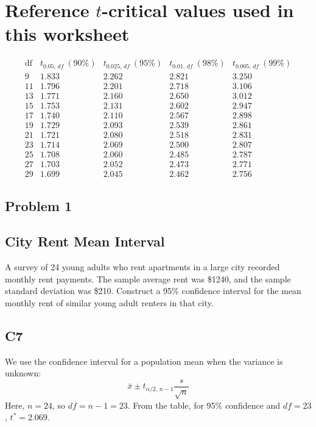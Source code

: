 


\section*{Reference $t$-critical values used in this worksheet}
\[
\begin{array}{c|cccc}
\text{df} & t_{0.05,\,df}\ (90\%) & t_{0.025,\,df}\ (95\%) & t_{0.01,\,df}\ (98\%) & t_{0.005,\,df}\ (99\%) \\
\hline
9  & 1.833 & 2.262 & 2.821 & 3.250 \\
11 & 1.796 & 2.201 & 2.718 & 3.106 \\
13 & 1.771 & 2.160 & 2.650 & 3.012 \\
15 & 1.753 & 2.131 & 2.602 & 2.947 \\
17 & 1.740 & 2.110 & 2.567 & 2.898 \\
19 & 1.729 & 2.093 & 2.539 & 2.861 \\
21 & 1.721 & 2.080 & 2.518 & 2.831 \\
23 & 1.714 & 2.069 & 2.500 & 2.807 \\
25 & 1.708 & 2.060 & 2.485 & 2.787 \\
27 & 1.703 & 2.052 & 2.473 & 2.771 \\
29 & 1.699 & 2.045 & 2.462 & 2.756
\end{array}
\]

\subsection*{Problem 1}
\subsection*{City Rent Mean Interval}
A survey of 24 young adults who rent apartments in a large city recorded monthly rent payments. The sample average rent was \$1240, and the sample standard deviation was \$210. Construct a 95\% confidence interval for the mean monthly rent of similar young adult renters in that city.

\subsection*{C7}
We use the confidence interval for a population mean when the variance is unknown:
\[
\bar{x} \pm t_{\alpha/2,\,n-1}\frac{s}{\sqrt{n}}
\]
Here, \(n=24\), so \(df=n-1=23\). From the table, for 95\% confidence and \(df=23\), \(t^*=2.069\).

